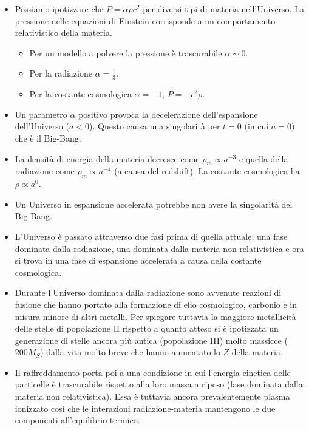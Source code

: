 \documentclass[11pt,a4paper]{article}
\begin{document}
\begin{itemize}
\item Possiamo ipotizzare che $P = \alpha \rho c^2$ per diversi tipi di materia nell'Universo. La pressione nelle equazioni di Einstein corrisponde a un comportamento relativistico della materia.

\begin{itemize}
\item Per un modello a polvere la pressione è trascurabile $\alpha \sim 0$.
\item Per la radiazione $\alpha = \frac{1}{3}$.
\item Per la costante cosmologica $\alpha = -1$, $P = - c^2 \rho$.
\end{itemize}

\item Un parametro $\alpha$ positivo provoca la  decelerazione dell'espansione dell'Universo ($\ddot{a} < 0$). Questo causa una singolarità per $t = 0$ (in cui $a = 0$) che è il Big-Bang.

\item La densità di energia della materia decresce come $\rho_{m} \propto a^{-3}$ e quella della radiazione come $\rho_{m} \propto a^{-4}$ (a causa del redshift). La costante cosmologica ha $\rho \propto a ^{0}$. 

\item Un Universo in espansione accelerata potrebbe non avere la singolarità del Big Bang.

\item L'Universo è passato attraverso due fasi prima di quella attuale: una fase dominata dalla radiazione, una dominata dalla materia non relativistica e ora si trova in una fase di espansione accelerata a causa della costante cosmologica.

\item Durante l'Universo dominata dalla radiazione sono avvenute reazioni di fusione che hanno portato alla formazione di elio cosmologico, carbonio e in misura minore di altri metalli. Per spiegare tuttavia la maggiore metallicità delle stelle di popolazione II rispetto a quanto atteso si è ipotizzata un generazione di stelle ancora più antica (popolazione III) molto massicce ($200M_S$) dalla vita molto breve che hanno aumentato lo $Z$ della materia.

\item Il raffreddamento porta poi a una condizione in cui l'energia cinetica delle particelle è trascurabile rispetto alla loro massa a riposo (fase dominata dalla materia non relativistica). Essa è tuttavia ancora prevalentemente plasma ionizzato così che le interazioni radiazione-materia mantengono le due componenti all'equilibrio termico.


\end{itemize}
\end{document}
